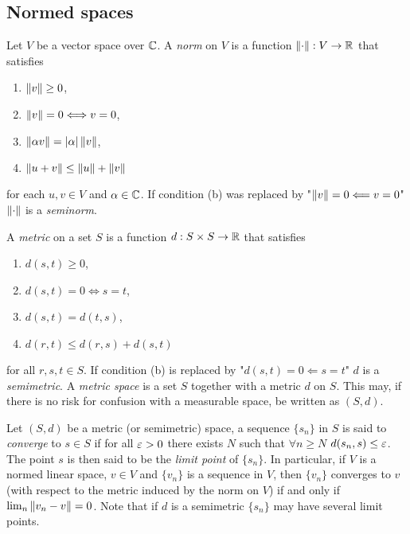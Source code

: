 \documentclass[12pt]{article}
\begin{document}
\subsection{Normed spaces}
\begin{definition}
    Let $V$ be a vector space over $\mathbb{C}$. A \textit{norm} on $V$ is a function $\left\lVert\cdot\right\rVert:V \to \mathbb{R}$ that satisfies
    \begin{enumerate}[label=(\alph*)]
        \item $\left\lVert v\right\rVert\geq 0$,
        \item $\left\lVert v\right\rVert=0 \Longleftrightarrow v=0$,
        \item $\left\lVert\alpha v\right\rVert=|\alpha|\left\lVert v\right\rVert$,
        \item $\left\lVert u+v\right\rVert\leq \left\lVert u\right\rVert+\left\lVert v\right\rVert$
    \end{enumerate}
    for each $u,v\in V$ and $\alpha\in \mathbb{C}$. If condition (b) was replaced by "$\left\lVert v\right\rVert=0 \Longleftarrow v=0$" $\left\lVert\cdot\right\rVert$ is a \textit{seminorm}.
\end{definition}
\begin{definition}
    A \textit{metric} on a set $S$ is a function $d:S\times S\to \mathbb{R}$ that satisfies
    \begin{enumerate}[label=(\alph*)]
        \item $d(s,t)\geq 0$,
        \item $d(s,t)=0 \Longleftrightarrow s=t$,
        \item $d(s,t)=d(t,s)$,
        \item $d(r,t)\leq d(r,s)+d(s,t)$
    \end{enumerate}
    for all $r,s,t\in S$. If condition (b) is replaced by "$d(s,t)=0 \Longleftarrow s=t$" $d$ is a \textit{semimetric}. A \textit{metric space} is a set $S$ together with a metric $d$ on $S$. This may, if there is no risk for confusion with a measurable space, be written as $(S,d)$.
\end{definition}
\begin{definition}
    Let $(S,d)$ be a metric (or semimetric) space, a sequence $\{s_n\}$ in $S$ is said to \textit{converge} to $s\in S$ if for all $\varepsilon>0$ there exists $N$ such that $\forall n \geq N$ $d(s_n,s)\leq\varepsilon$. The point $s$ is then said to be the \textit{limit point} of $\{s_n\}$. In particular, if $V$ is a normed linear space, $v\in V$ and $\{v_n\}$ is a sequence in $V$, then $\{v_n\}$ converges to $v$ (with respect to the metric induced by the norm on $V$) if and only if $\lim_n \left\lVert v_n-v\right\rVert=0$. Note that if $d$ is a semimetric $\{s_n\}$ may have several limit points.
\end{definition}
\end{document}
